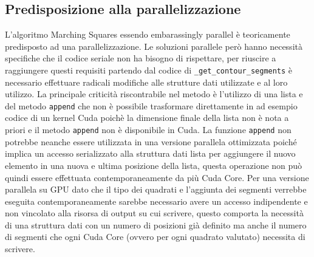 \documentclass[12pt,a4paper]{report}
\begin{document}
\subsection{Predisposizione alla parallelizzazione}
L'algoritmo Marching Squares essendo embarassingly parallel è teoricamente predisposto ad una parallelizzazione. Le soluzioni parallele però hanno necessità specifiche che il codice seriale non ha bisogno di rispettare,  per riuscire a raggiungere questi requisiti partendo dal codice di  \verb|_get_contour_segments| è necessario effettuare radicali modifiche alle strutture dati utilizzate e al loro utilizzo. \newline
La principale criticità riscontrabile nel metodo è l'utilizzo di una lista e del metodo \verb|append| che non è possibile trasformare direttamente in ad esempio codice di un kernel Cuda poichè la dimensione finale della lista non è nota a priori e il metodo  \verb|append| non è disponibile in Cuda.  La funzione \verb|append| non potrebbe neanche essere utilizzata in una versione parallela ottimizzata poiché implica un accesso serializzato alla struttura dati lista per aggiungere il nuovo elemento in una nuova e ultima posizione della lista, questa operazione non può quindi essere effettuata contemporaneamente da più Cuda Core.  Per una versione parallela su GPU dato che il tipo dei quadrati e l'aggiunta dei segmenti verrebbe eseguita contemporaneamente sarebbe necessario avere un accesso indipendente e non vincolato alla risorsa di output su cui scrivere,  questo comporta la necessità di una struttura dati con un numero di posizioni già definito ma anche il numero di segmenti che ogni Cuda Core (ovvero per ogni quadrato valutato) necessita di scrivere.

\end{document}
